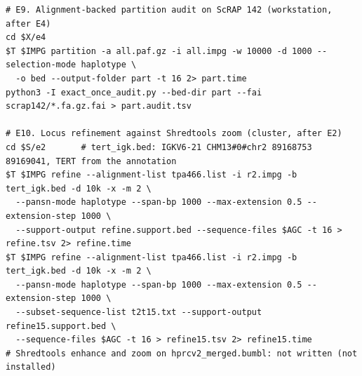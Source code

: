 {\begin{verbatim}
# E9. Alignment-backed partition audit on ScRAP 142 (workstation, after E4)
cd $X/e4
$T $IMPG partition -a all.paf.gz -i all.impg -w 10000 -d 1000 --selection-mode haplotype \
  -o bed --output-folder part -t 16 2> part.time
python3 -I exact_once_audit.py --bed-dir part --fai scrap142/*.fa.gz.fai > part.audit.tsv

# E10. Locus refinement against Shredtools zoom (cluster, after E2)
cd $S/e2       # tert_igk.bed: IGKV6-21 CHM13#0#chr2 89168753 89169041, TERT from the annotation
$T $IMPG refine --alignment-list tpa466.list -i r2.impg -b tert_igk.bed -d 10k -x -m 2 \
  --pansn-mode haplotype --span-bp 1000 --max-extension 0.5 --extension-step 1000 \
  --support-output refine.support.bed --sequence-files $AGC -t 16 > refine.tsv 2> refine.time
$T $IMPG refine --alignment-list tpa466.list -i r2.impg -b tert_igk.bed -d 10k -x -m 2 \
  --pansn-mode haplotype --span-bp 1000 --max-extension 0.5 --extension-step 1000 \
  --subset-sequence-list t2t15.txt --support-output refine15.support.bed \
  --sequence-files $AGC -t 16 > refine15.tsv 2> refine15.time
# Shredtools enhance and zoom on hprcv2_merged.bumbl: not written (not installed)
\end{verbatim}
}
